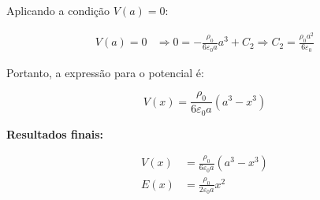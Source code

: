 \documentclass[a4paper,12pt]{article}
\begin{document}
\begin{flushleft}
Aplicando a condição \( V(a) = 0 \):

\begin{align}
V(a) = 0 &\Rightarrow 0 = -\frac{\rho_0}{6\varepsilon_0 a} a^3 + C_2 \Rightarrow \boxed{C_2 = \frac{\rho_0 a^2}{6\varepsilon_0}}
\end{align}

Portanto, a expressão para o potencial é:

\begin{equation}
\boxed{V(x) = \frac{\rho_0}{6\varepsilon_0 a} \left( a^3 - x^3 \right)}
\end{equation}

\bigskip

\noindent\textbf{Resultados finais:}

\begin{equation}
\boxed{
\begin{aligned}
V(x) &= \frac{\rho_0}{6\varepsilon_0 a} \left( a^3 - x^3 \right) \\
E(x) &= \frac{\rho_0}{2\varepsilon_0 a} x^2
\end{aligned}
}
\end{equation}
\end{flushleft}
\end{document}
